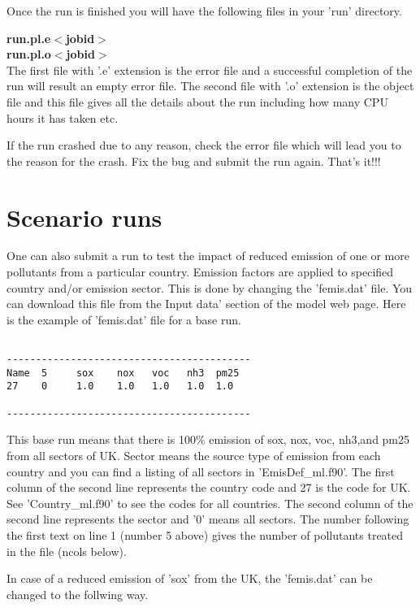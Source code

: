 Once the run is finished you will have the following files in your
'run' directory. 

\textbf{run.pl.e$<$jobid$>$}\\
\textbf{run.pl.o$<$jobid$>$}\\

The first file with '.e' extension is the error file and a successful
completion of the run will result an empty error file.  The second
file with '.o' extension is the object file and this file gives all the
details about the run including how many CPU hours it has taken etc.  

If the run crashed due to any reason, check the error file which will
lead you to the reason for the crash.  Fix the bug and submit the run
again.  That's it!!!  


\section{Scenario runs}

One can also submit a run to test the impact of reduced emission of
one or more pollutants from a particular country.  Emission factors
are applied to specified country and/or emission sector.  This is done by
changing the 'femis.dat' file. You can download this file from the Input
data' section of the model web page.  Here is the example of 'femis.dat'
file for a base run. 

\begin{verbatim}

------------------------------------------
Name  5     sox    nox   voc   nh3  pm25
27    0     1.0    1.0   1.0   1.0  1.0  

------------------------------------------

\end{verbatim}

This base run means that there is 100\% emission of sox, nox, voc,
nh3,and pm25 from all sectors of UK.  Sector means the source type of
emission from each country and you can find a listing of all sectors
in 'EmisDef\_ml.f90'.  The first column of the second
line represents the country code and 27 is the code for UK.  See
'Country\_ml.f90' to see the codes for all countries.  The second
column of the second line 
represents the sector and '0' means all sectors.  The number following
the first text on line 1 (number 5 above) gives the number of
pollutants treated in the file (ncols below).   
              

In case of a reduced emission of 'sox' from the UK, the 'femis.dat' can be
changed to the follwing way. 


